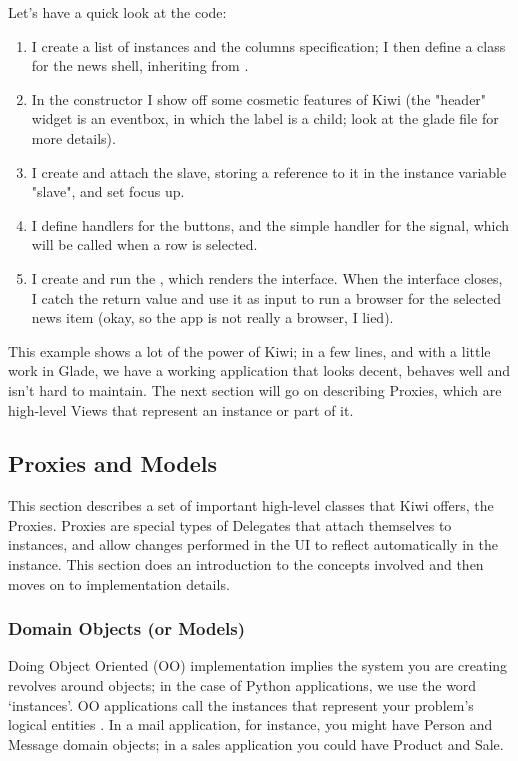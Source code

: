 \documentclass[a4paper]{howto}
\begin{document}
Let's have a quick look at the code:

\begin{enumerate}
\item I create a list of instances and the columns specification; I then
define a class for the news shell, inheriting from
.
\item In the constructor I show off some cosmetic features of Kiwi (the
"header" widget is an eventbox, in which the label is a child; look at
the glade file for more details).
\item I create and attach the slave, storing a reference to it in the
instance variable "slave", and set focus up.
\item I define handlers for the buttons, and the simple handler
 for the  signal, which will be
called when a row is selected.
\item I create and run the , which renders the interface.
When the interface closes, I catch the return value  and
use it as input to run a browser for the selected news item (okay, so
the app is not really a browser, I lied).
\end{enumerate}

This example shows a lot of the power of Kiwi; in a few lines, and with
a little work in Glade, we have a working application that looks decent,
behaves well and isn't hard to maintain. The next section will go on
describing Proxies, which are high-level Views that represent an
instance or part of it.

\subsection{Proxies and Models}

This section describes a set of important high-level classes that Kiwi
offers, the Proxies. Proxies are special types of Delegates that attach
themselves to instances, and allow changes performed in the UI to
reflect automatically in the instance. This section does an introduction
to the concepts involved and then moves on to implementation details.

\subsubsection{Domain Objects (or Models)}

Doing Object Oriented (OO) implementation implies the system you are
creating revolves around objects; in the case of Python applications, we
use the word `instances'. OO applications call the instances that
represent your problem's logical entities
. In a
mail application, for instance, you might have Person and Message domain
objects; in a sales application you could have Product and Sale.
\end{document}

